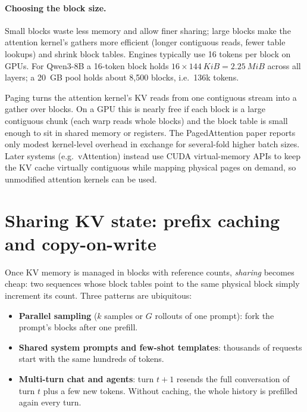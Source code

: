 \paragraph{Choosing the block size.} Small blocks waste less memory and allow finer sharing; large
blocks make the attention kernel's gathers more efficient (longer contiguous reads, fewer table
lookups) and shrink block tables. Engines typically use 16 tokens per block on GPUs. For Qwen3-8B a
16-token block holds $16\times\SI{144}{KiB}=\SI{2.25}{MiB}$ across all layers; a \SI{20}{GB} pool holds about
8,500 blocks, i.e.\ 136k tokens.

\begin{systemslens}
Paging turns the attention kernel's KV reads from one contiguous stream into a gather over blocks.
On a GPU this is nearly free if each block is a large contiguous chunk (each warp reads whole blocks)
and the block table is small enough to sit in shared memory or registers. The PagedAttention paper
reports only modest kernel-level overhead in exchange for several-fold higher batch sizes. Later
systems (e.g.\ vAttention) instead use CUDA virtual-memory APIs to keep the KV cache virtually
contiguous while mapping physical pages on demand, so unmodified attention kernels can be used.
\end{systemslens}

\section{Sharing KV state: prefix caching and copy-on-write}\label{sec:serving:prefix}

Once KV memory is managed in blocks with reference counts, \emph{sharing} becomes cheap: two
sequences whose block tables point to the same physical block simply increment its count. Three
patterns are ubiquitous:
\begin{itemize}
  \item \textbf{Parallel sampling} ($k$ samples or $G$ rollouts of one prompt): fork the prompt's
    blocks after one prefill.
  \item \textbf{Shared system prompts and few-shot templates}: thousands of requests start with the
    same hundreds of tokens.
  \item \textbf{Multi-turn chat and agents}: turn $t+1$ resends the full conversation of turn $t$ plus a
    few new tokens. Without caching, the whole history is prefilled again every turn.
\end{itemize}

